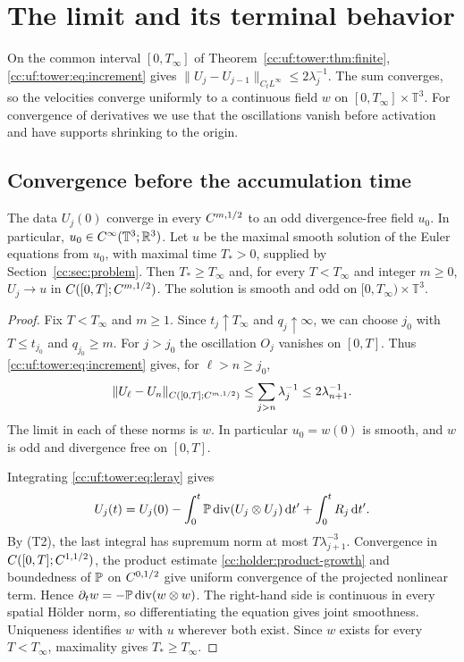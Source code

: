 \section{The limit and its terminal behavior}\label{cc:sec:limit}
On the common interval $[0,T_\infty]$ of Theorem~\ref{cc:uf:tower:thm:finite},
\eqref{cc:uf:tower:eq:increment} gives $\|U_j-U_{j-1}\|_{C_tL^\infty}
\le2\lambda_j^{-1}$. The sum converges, so the velocities converge
uniformly to a continuous field $w$ on $[0,T_\infty]\times\mathbb T^3$.
For convergence of derivatives we use that the oscillations vanish
before activation and have supports shrinking to the origin.

\subsection{Convergence before the accumulation time}

\begin{proposition}\label{cc:uf:terminal:agreement}
The data $U_j(0)$ converge in every $C^{m,1/2}$ to an odd divergence-free field $u_0$.
In particular, $u_0\in C^\infty(\mathbb T^3;\mathbb R^3)$.
Let $u$ be the maximal smooth
solution of the Euler equations from $u_0$, with maximal time $T_*>0$, supplied by
Section~\ref{cc:sec:problem}. Then $T_*\ge T_\infty$ and, for every
$T<T_\infty$ and integer $m\ge0$,
$U_j\to u$ in $C([0,T];C^{m,1/2})$. The solution is smooth and odd on
$[0,T_\infty)\times\mathbb T^3$.
\end{proposition}
\begin{proof}
Fix $T<T_\infty$ and $m\ge1$. Since $t_j\uparrow T_\infty$ and
$q_j\uparrow\infty$, we can choose $j_0$ with $T\le t_{j_0}$ and
$q_{j_0}\ge m$. For $j>j_0$ the oscillation $O_j$ vanishes on $[0,T]$.
Thus \eqref{cc:uf:tower:eq:increment} gives, for $\ell>n\ge j_0$,
\[
 \|U_\ell-U_n\|_{C([0,T];C^{m,1/2})}
 \le\sum_{j>n}\lambda_j^{-1}\le2\lambda_{n+1}^{-1}.
\]
The limit in each of these norms is $w$. In particular $u_0=w(0)$ is
smooth, and $w$ is odd and divergence free on $[0,T]$.

Integrating \eqref{cc:uf:tower:eq:leray} gives
\[
 U_j(t)=U_j(0)-\int_0^t\mathbb P\operatorname{div}(U_j\otimes U_j)\,\mathrm d t'
        +\int_0^tR_j\,\mathrm d t'.
\]
By \textup{(T2)}, the last integral has supremum norm at most
$T\lambda_{j+1}^{-3}$. Convergence in $C([0,T];C^{1,1/2})$, the product
estimate \eqref{cc:holder:product-growth} and boundedness of $\mathbb P$ on
$C^{0,1/2}$ give uniform convergence of the projected nonlinear term.
Hence $\partial_t w=-\mathbb P\operatorname{div}(w\otimes w)$. The right-hand side is
continuous in every spatial H\"older norm, so differentiating the equation
gives joint smoothness. Uniqueness identifies $w$ with $u$ wherever both
exist. Since $w$ exists for every $T<T_\infty$, maximality gives
$T_*\ge T_\infty$.
\end{proof}


